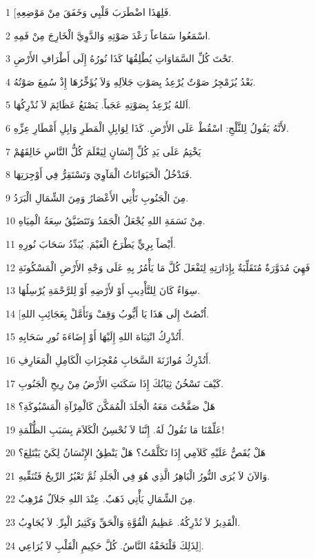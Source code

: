 \par 1 [فَلِهَذَا اضْطَرَبَ قَلْبِي وَخَفَقَ مِنْ مَوْضِعِهِ.
\par 2 اسْمَعُوا سَمَاعاً رَعْدَ صَوْتِهِ وَالدَّوِيَّ الْخَارِجَ مِنْ فَمِهِ.
\par 3 تَحْتَ كُلِّ السَّمَاوَاتِ يُطْلِقُهَا كَذَا نُورُهُ إِلَى أَطْرَافِ الأَرْضِ.
\par 4 بَعْدُ يُزَمْجِرُ صَوْتٌ يُرْعِدُ بِصَوْتِ جَلاَلِهِ وَلاَ يُؤَخِّرُهَا إِذْ سُمِعَ صَوْتُهُ.
\par 5 اَللهُ يُرْعِدُ بِصَوْتِهِ عَجَباً. يَصْنَعُ عَظَائِمَ لاَ نُدْرِكُهَا.
\par 6 لأَنَّهُ يَقُولُ لِلثَّلْجِ: اسْقُطْ عَلَى الأَرْضِ. كَذَا لِوَابِلِ الْمَطَرِ وَابِلِ أَمْطَارِ عِزِّهِ.
\par 7 يَخْتِمُ عَلَى يَدِ كُلِّ إِنْسَانٍ لِيَعْلَمَ كُلُّ النَّاسِ خَالِقَهُمْ
\par 8 فَتَدْخُلُ الْحَيَوَانَاتُ الْمَآوِيَ وَتَسْتَقِرُّ فِي أَوْجِرَتِهَا.
\par 9 مِنَ الْجَنُوبِ تَأْتِي الأَعْصَارُ وَمِنَ الشِّمَالِ الْبَرَدُ.
\par 10 مِنْ نَسَمَةِ اللهِ يُجْعَلُ الْجَمَدُ وَتَتَضَيَّقُ سِعَةُ الْمِيَاهِ.
\par 11 أَيْضاً بِرِيٍّ يَطْرَحُ الْغَيْمَ. يُبَدِّدُ سَحَابَ نُورِهِ.
\par 12 فَهِيَ مُدَوَّرَةٌ مُتَقَلِّبَةٌ بِإِدَارَتِهِ لِتَفْعَلَ كُلَّ مَا يَأْمُرُ بِهِ عَلَى وَجْهِ الأَرْضِ الْمَسْكُونَةِ
\par 13 سِوَاءٌ كَانَ لِلتَّأْدِيبِ أَوْ لأَرْضِهِ أَوْ لِلرَّحْمَةِ يُرْسِلُهَا.
\par 14 [اُنْصُتْ إِلَى هَذَا يَا أَيُّوبُ وَقِفْ وَتَأَمَّلْ بِعَجَائِبِ اللهِ.
\par 15 أَتُدْرِكُ انْتِبَاهَ اللهِ إِلَيْهَا أَوْ إِضَاءَةَ نُورِ سَحَابِهِ.
\par 16 أَتُدْرِكُ مُوازَنَةَ السَّحَابِ مُعْجِزَاتِ الْكَامِلِ الْمَعَارِفِ.
\par 17 كَيْفَ تَسْخُنُ ثِيَابُكَ إِذَا سَكَنَتِ الأَرْضُ مِنْ رِيحِ الْجَنُوبِ.
\par 18 هَلْ صَفَّحْتَ مَعَهُ الْجَلَدَ الْمُمَكَّنَ كَالْمِرْآةِ الْمَسْبُوكَةِ؟
\par 19 عَلِّمْنَا مَا نَقُولُ لَهُ. إِنَّنَا لاَ نُحْسِنُ الْكَلاَمَ بِسَبَبِ الظُّلْمَةِ!
\par 20 هَلْ يُقَصُّ عَلَيْهِ كَلاَمِي إِذَا تَكَلَّمْتُ؟ هَلْ يَنْطِقُ الإِنْسَانُ لِكَيْ يَبْتَلِعَ؟
\par 21 وَالآنَ لاَ يُرَى النُّورُ الْبَاهِرُ الَّذِي هُوَ فِي الْجَلَدِ ثُمَّ تَعْبُرُ الرِّيحُ فَتُنَقِّيهِ.
\par 22 مِنَ الشِّمَالِ يَأْتِي ذَهَبٌ. عِنْدَ اللهِ جَلاَلٌ مُرْهِبٌ.
\par 23 الْقَدِيرُ لاَ نُدْرِكُهُ. عَظِيمُ الْقُوَّةِ وَالْحَقِّ وَكَثِيرُ الْبِرِّ. لاَ يُجَاوِبُ.
\par 24 لِذَلِكَ فَلْتَخَفْهُ النَّاسُ. كُلَّ حَكِيمِ الْقَلْبِ لاَ يُرَاعِي].

